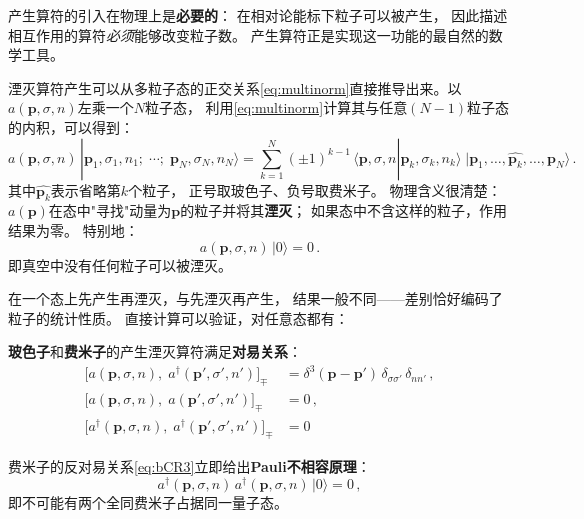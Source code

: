产生算符的引入在物理上是\textbf{必要的}：
在相对论能标下粒子可以被产生，
因此描述相互作用的算符\emph{必须}能够改变粒子数。
产生算符正是实现这一功能的最自然的数学工具。
\medskip


湮灭算符产生可以从多粒子态的正交关系\eqref{eq:multinorm}直接推导出来。以$a(\boldsymbol{p},\sigma,n)$左乘一个$N$粒子态，
利用\eqref{eq:multinorm}计算其与任意$(N{-}1)$粒子态的内积，可以得到：
\begin{equation}\label{eq:annihilate}
a(\boldsymbol{p},\sigma,n)\,|\boldsymbol{p}_1,\sigma_1,n_1;\;\cdots;\;
\boldsymbol{p}_N,\sigma_N,n_N\rangle
= \sum_{k=1}^{N}(\pm 1)^{k-1}\,
\langle\boldsymbol{p},\sigma,n|\boldsymbol{p}_k,\sigma_k,n_k\rangle\;
|\boldsymbol{p}_1,\ldots,\widehat{\boldsymbol{p}_k},\ldots,\boldsymbol{p}_N\rangle\,.
\end{equation}
其中$\widehat{\boldsymbol{p}_k}$表示省略第$k$个粒子，
正号取玻色子、负号取费米子。
物理含义很清楚：
$a(\boldsymbol{p})$在态中"寻找"动量为$\boldsymbol{p}$的粒子并将其\textbf{湮灭}；
如果态中不含这样的粒子，作用结果为零。
特别地：
\begin{equation}\label{eq:avac}
a(\boldsymbol{p},\sigma,n)\,|0\rangle = 0\,.
\end{equation}
即真空中没有任何粒子可以被湮灭。


\medskip

在一个态上先产生再湮灭，与先湮灭再产生，
结果一般不同——差别恰好编码了粒子的统计性质。
直接计算可以验证，对任意态都有：
\begin{tcolorbox}[colback=white!5,colframe=black!45]
\textbf{玻色子}和\textbf{费米子}的产生湮灭算符满足\textbf{对易关系}：
\begin{subequations}
      \begin{align}
      \big[a(\boldsymbol{p},\sigma,n),\;a^\dagger(\boldsymbol{p}',\sigma',n')\big]_\mp
      &= \delta^3(\boldsymbol{p}-\boldsymbol{p}')\,\delta_{\sigma\sigma'}\,\delta_{nn'}\,,
      \label{eq:bCR1}\\[4pt]
      \big[a(\boldsymbol{p},\sigma,n),\;a(\boldsymbol{p}',\sigma',n')\big]_\mp
      &= 0\,,\label{eq:bCR2}\\[4pt]
      \big[a^\dagger(\boldsymbol{p},\sigma,n),\;a^\dagger(\boldsymbol{p}',\sigma',n')\big]_\mp
      &= 0
\end{align}
\end{subequations}\label{eq:bCR3}
\end{tcolorbox}

\noindent 费米子的反对易关系\eqref{eq:bCR3}立即给出\textbf{Pauli不相容原理}：
\begin{equation}
a^\dagger(\boldsymbol{p},\sigma,n)\,a^\dagger(\boldsymbol{p},\sigma,n)\,|0\rangle
= 0\,,
\end{equation}
即不可能有两个全同费米子占据同一量子态。

